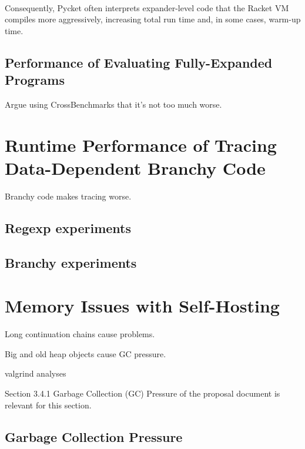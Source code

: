 			\paragraph{}%
			Consequently, Pycket often interprets expander-level code that the Racket VM compiles more aggressively, increasing total run time and, in some cases, warm-up time.

		\subsection{Performance of Evaluating Fully-Expanded Programs}

			\begin{mainpoint}
				Argue using CrossBenchmarks that it's not too much worse.
			\end{mainpoint}

	\section{Runtime Performance of Tracing Data-Dependent Branchy Code}
		\begin{mainpoint}
			Branchy code makes tracing worse.
		\end{mainpoint}

		\subsection{Regexp experiments}
		\subsection{Branchy experiments}
			\label{section:branchy}

	\section{Memory Issues with Self-Hosting}
		\label{section:memory}

		\begin{mainpoint}
			Long continuation chains cause problems.

			Big and old heap objects cause GC pressure.
		\end{mainpoint}

		valgrind analyses

		\begin{todo}[Import]
			Section 3.4.1 Garbage Collection (GC) Pressure of the proposal document is relevant for this section.
		\end{todo}

		\subsection{Garbage Collection Pressure}
